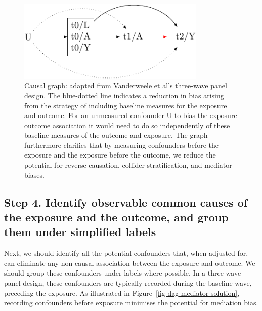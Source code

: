 \documentclass[
  singlecolumn]{report}
\begin{document}
\begin{figure}

{\centering \includegraphics[width=0.8\textwidth,height=\textheight]{causal-dags_files/figure-pdf/fig-dag-6-1.pdf}

}

\caption{\label{fig-dag-6}Causal graph: adapted from Vanderweele et al's
three-wave panel design. The blue-dotted line indicates a reduction in
bias arising from the strategy of including baseline measures for the
exposure and outcome. For an unmeasured confounder U to bias the
exposure outcome association it would need to do so independently of
these baseline measures of the outcome and exposure. The graph
furthermore clarifies that by measuring confounders before the exposure
and the exposure before the outcome, we reduce the potential for reverse
causation, collider stratification, and mediator biases.}

\end{figure}

\hypertarget{step-4.-identify-observable-common-causes-of-the-exposure-and-the-outcome-and-group-them-under-simplified-labels}{%
\subsection{Step 4. Identify observable common causes of the exposure
and the outcome, and group them under simplified
labels}\label{step-4.-identify-observable-common-causes-of-the-exposure-and-the-outcome-and-group-them-under-simplified-labels}}

Next, we should identify all the potential confounders that, when
adjusted for, can eliminate any non-causal association between the
exposure and outcome. We should group these confounders under labels
where possible. In a three-wave panel design, these confounders are
typically recorded during the baseline wave, preceding the exposure. As
illustrated in Figure~\ref{fig-dag-mediator-solution}, recording
confounders before exposure minimises the potential for mediation bias.
\end{document}
